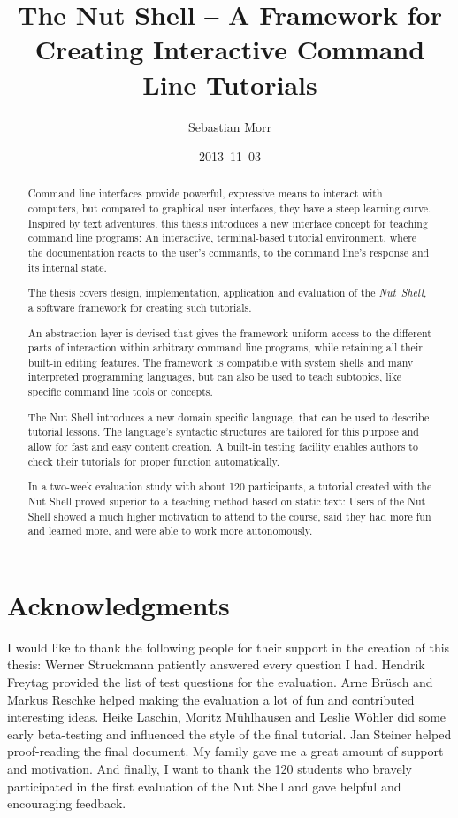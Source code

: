 \documentclass[paper=a4,abstract=on,cleardoublepage=empty,numbers=noenddot,toc=bib,12pt,appendixprefix=true]{scrreprt}
\title{The Nut Shell -- A Framework for Creating Interactive Command Line Tutorials}
\author{Sebastian Morr}
\date{2013--11--03}
\begin{document}
\maketitle
\restoregeometry

\begin{abstract}
    Command line interfaces provide powerful, expressive means to interact with computers, but compared to graphical user interfaces, they have a steep learning curve. Inspired by text adventures, this thesis introduces a new interface concept for teaching command line programs: An interactive, terminal-based tutorial environment, where the documentation reacts to the user's commands, to the command line's response and its internal state.

    The thesis covers design, implementation, application and evaluation of the \emph{Nut~Shell}, a software framework for creating such tutorials.

    An abstraction layer is devised that gives the framework uniform access to the different parts of interaction within arbitrary command line programs, while retaining all their built-in editing features. The framework is compatible with system shells and many interpreted programming languages, but can also be used to teach subtopics, like specific command line tools or concepts.

    The Nut Shell introduces a new domain specific language, that can be used to describe tutorial lessons. The language's syntactic structures are tailored for this purpose and allow for fast and easy content creation. A built-in testing facility enables authors to check their tutorials for proper function automatically.

    In a two-week evaluation study with about 120 participants, a tutorial created with the Nut Shell proved superior to a teaching method based on static text: Users of the Nut Shell showed a much higher motivation to attend to the course, said they had more fun and learned more, and were able to work more autonomously.
\end{abstract}

\cleardoublepage

\section*{Acknowledgments}

I would like to thank the following people for their support in the creation of this thesis:
Werner Struckmann patiently answered every question I had.
Hendrik Freytag provided the list of test questions for the evaluation.
Arne Brüsch and Markus Reschke helped making the evaluation a lot of fun and contributed interesting ideas.
Heike Laschin, Moritz Mühlhausen and Leslie Wöhler did some early beta-testing and influenced the style of the final tutorial.
Jan Steiner helped proof-reading the final document.
My family gave me a great amount of support and motivation.
And finally, I want to thank the 120 students who bravely participated in the first evaluation of the Nut Shell and gave helpful and encouraging feedback.
\end{document}
